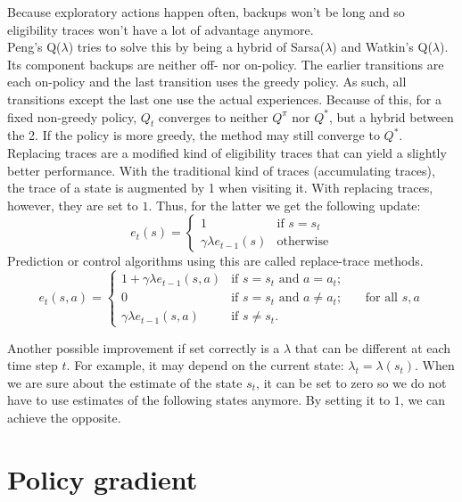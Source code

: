 Because exploratory actions happen often, backups won't be long and so eligibility traces won't have a lot of advantage anymore.\\
Peng's Q($\lambda$) tries to solve this by being a hybrid of Sarsa($\lambda$) and Watkin's Q($\lambda$). Its component backups are neither off- nor on-policy. The earlier transitions are each on-policy and the last transition uses the greedy policy. As such, all transitions except the last one use the actual experiences. Because of this, for a fixed non-greedy policy, $Q_t$ converges to neither $Q^{\pi}$ nor $Q^{*}$, but a hybrid between the 2. If the policy is more greedy, the method may still converge to $Q^{*}$.\\

Replacing traces are a modified kind of eligibility traces that can yield a slightly better performance. With the traditional kind of traces (accumulating traces), the trace of a state is augmented by 1 when visiting it. With replacing traces, however, they are set to $1$. Thus, for the latter we get the following update:
\begin{equation}
e_t(s) = \begin{cases}
1 & \text{if $s=s_t$}\\
\gamma \lambda e_{t-1}(s) & \text{otherwise}
\end{cases}
\end{equation}
Prediction or control algorithms using this are called replace-trace methods.
\begin{equation}
e_t(s,a) = \begin{cases}
1 + \gamma \lambda e_{t-1}(s,a) & \text{if $s=s_t$ and $a=a_t$;}\\
0 & \text{if $s=s_t$ and $a \neq a_t$;} \qquad \text{for all $s,a$}\\
\gamma \lambda e_{t-1}(s,a) & \text{if $s \neq s_t$.}
\end{cases}
\end{equation}

Another possible improvement if set correctly is a $\lambda$ that can be different at each time step $t$.
For example, it may depend on the current state: $\lambda_t = \lambda(s_t)$.
When we are sure about the estimate of the state $s_t$, it can be set to zero so we do not have to use estimates of the following states anymore.
By setting it to $1$, we can achieve the opposite.

\section{Policy gradient}
\label{sub:rl:policy_gradient}

